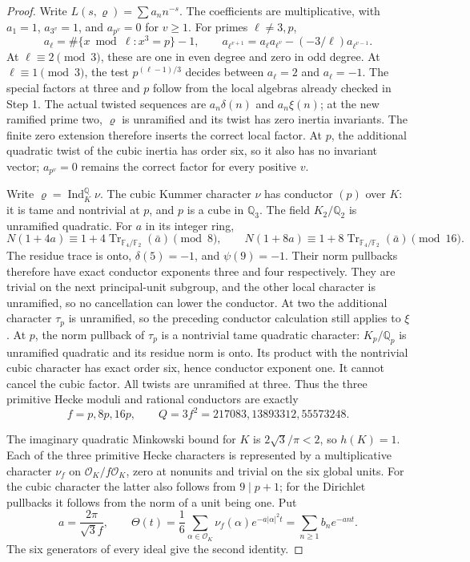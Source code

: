 \begin{proof}
Write $L(s,\varrho)=\sum a_n n^{-s}$.  The coefficients are
multiplicative, with $a_1=1$, $a_{3^v}=1$, and $a_{p^v}=0$
for $v\ge1$.  For primes $\ell\ne3,p$,
\[
 a_\ell=\#\{x\bmod\ell:x^3=p\}-1,\qquad
 a_{\ell^{v+1}}=a_\ell a_{\ell^v}-(-3/\ell)a_{\ell^{v-1}}.
 \tag{C16R.20}
\]
At $\ell\equiv2\pmod3$, these are one in even degree and zero
in odd degree.  At $\ell\equiv1\pmod3$, the test
$p^{(\ell-1)/3}$ decides between $a_\ell=2$ and $a_\ell=-1$.
The special factors at three and $p$ follow from the local algebras
already checked in Step 1.  The actual twisted sequences are
$a_n\delta(n)$ and $a_n\xi(n)$; at the new ramified prime two,
$\varrho$ is unramified and its twist has zero inertia invariants.
The finite zero extension therefore inserts the correct local factor.
At $p$, the additional quadratic twist of the cubic inertia has
order six, so it also has no invariant vector; $a_{p^v}=0$
remains the correct factor for every positive $v$.

Write $\varrho=\operatorname{Ind}_{K}^{\mathbb Q}\nu$.
The cubic Kummer character $\nu$ has conductor $(p)$ over $K$:
it is tame and nontrivial at $p$, and $p$ is a cube in $\mathbb Q_3$.
The field $K_2/\mathbb Q_2$ is unramified quadratic.  For $a$ in
its integer ring,
\[
 N(1+4a)\equiv1+4\operatorname{Tr}_{\mathbb F_4/\mathbb F_2}(\bar a)
       \pmod8,\qquad
 N(1+8a)\equiv1+8\operatorname{Tr}_{\mathbb F_4/\mathbb F_2}(\bar a)
       \pmod{16}.
 \tag{C16R.21}
\]
The residue trace is onto, $\delta(5)=-1$, and $\psi(9)=-1$.
Their norm pullbacks therefore have exact conductor exponents
three and four respectively.  They are trivial on the next
principal-unit subgroup, and the other local character is
unramified, so no cancellation can lower the conductor.
At two the additional character $\tau_p$ is unramified, so
the preceding conductor calculation still applies to $\xi$.
At $p$, the norm pullback of $\tau_p$ is a nontrivial tame
quadratic character: $K_p/\mathbb Q_p$ is unramified quadratic
and its residue norm is onto.  Its product with the nontrivial
cubic character has exact order six, hence conductor exponent one.
It cannot cancel the cubic factor.  All twists are unramified at
three.  Thus the three
primitive Hecke moduli and rational conductors are exactly
\[
 f=p,8p,16p,\qquad
 Q=3f^2=217083,13893312,55573248.
 \tag{C16R.22}
\]

The imaginary quadratic Minkowski bound for $K$ is
$2\sqrt3/\pi<2$, so $h(K)=1$.
Each of the three primitive Hecke characters is represented by
a multiplicative character $\nu_f$ on $\mathcal O_K/f\mathcal O_K$,
zero at nonunits and trivial on the six global units.
For the cubic character the latter also follows from
$9\mid p+1$; for the Dirichlet pullbacks it follows from the norm
of a unit being one.  Put
\[
 a=\frac{2\pi}{\sqrt3f},\qquad
 \Theta(t)=\frac16\sum_{\alpha\in\mathcal O_K}
    \nu_f(\alpha)e^{-a|\alpha|^2t}
       =\sum_{n\ge1}b_ne^{-ant}.
 \tag{C16R.23}
\]
The six generators of every ideal give the second identity.


\end{proof}
